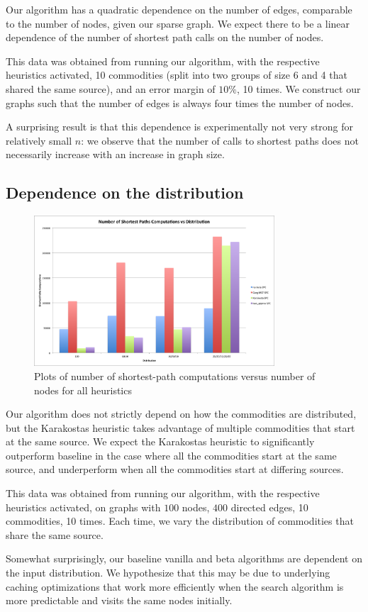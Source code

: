 Our algorithm has a quadratic dependence on the number of edges, comparable to the number of nodes, given our sparse
graph.  We expect there to be a linear dependence of the number of shortest path calls on the number of nodes.

This data was obtained from running our algorithm, with the respective heuristics activated, 10 commodities (split into
two groups of size 6 and 4 that shared the same source), and an error margin of $10\%$, 10
times. We construct our graphs such that the number of edges is always four times the number of nodes.

A surprising result is that this dependence is experimentally not very strong for relatively small $n$: we observe that
the number of calls to shortest paths does not necessarily increase with an increase in graph size.

\subsection{Dependence on the distribution}

\begin{figure}
\begin{center}
\mbox{\includegraphics[width=0.8\textwidth]{figures/distribution.png}}
\caption{Plots of number of shortest-path computations versus number
  of nodes for all heuristics}
\end{center}
\end{figure}

Our algorithm does not strictly depend on how the commodities are distributed, but the Karakostas heuristic takes
advantage of multiple commodities that start at the same source. We expect the Karakostas heuristic to significantly
outperform baseline in the case where all the commodities start at the same source, and underperform when all the
commodities start at differing sources.

This data was obtained from running our algorithm, with the respective heuristics activated, on graphs with $100$
nodes, $400$ directed edges, 10 commodities, 10
times. Each time, we vary the distribution of commodities that share the same source.

Somewhat surprisingly, our baseline vanilla and beta algorithms are dependent on the input distribution.  We hypothesize
that this may be due to underlying caching optimizations that work more efficiently when the search algorithm is more
predictable and visits the same nodes initially.


